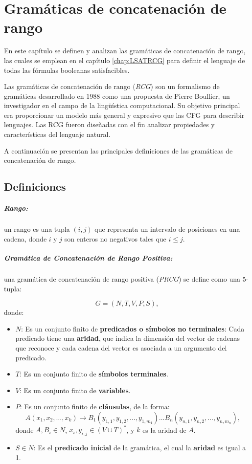 
\chapter{Gramáticas de concatenación de rango}
\label{chap:RCG}

En este capítulo se definen y analizan las gramáticas de concatenación de rango, las cuales se emplean en el
capítulo \ref{chap:LSATRCG} para definir el lenguaje de todas las fórmulas booleanas satisfacibles.

Las gramáticas de concatenación de rango (\textit{RCG}) \cite{mainRCGBib} son un formalismo de gramáticas desarrollado
en 1988 como una propuesta de Pierre Boullier, un investigador en el campo de la lingüística computacional. Su
objetivo principal era proporcionar un modelo más general y expresivo que las CFG para describir lenguajes.
Las RCG fueron diseñadas con el fin analizar propiedades y características del lenguaje natural.

A continuación se presentan las principales definiciones de las gramáticas de concatenación de rango.

\section{Definiciones}

\paragraph{Rango:} un rango es una tupla $(i, j)$ que representa un intervalo de posiciones en una cadena, donde $i$ y $j$ son enteros no negativos tales que $i \leq j$.

\paragraph{Gramática de Concatenación de Rango Positiva:} una gramática de concatenación de rango positiva (\textit{PRCG}) se define como una 5-tupla:

\[
    G = (N, T, V, P, S),
\]
donde:

\begin{itemize}
    \item $N$: Es un conjunto finito de \textbf{predicados o símbolos no terminales}: Cada predicado tiene una \textbf{aridad}, que indica la dimensión del vector de cadenas que reconoce y cada cadena del vector es asociada a un argumento del predicado.
    \item $T$: Es un conjunto finito de \textbf{símbolos terminales}.
    \item $V$: Es un conjunto finito de \textbf{variables}.
    \item $P$: Es un conjunto finito de \textbf{cláusulas}, de la forma:
          \[
              A(x_1, x_2, \ldots, x_k) \to B_1(y_{1,1}, y_{1,2}, \ldots, y_{1,m_1}) \ldots B_n(y_{n,1}, y_{n,2}, \ldots, y_{n,m_n}),
          \]
          donde $A, B_i \in N$, $x_i, y_{i,j} \in (V \cup T)^*$, y $k$ es la aridad de $A$.
    \item $S \in N$: Es el \textbf{predicado inicial} de la gramática, el cual la \textbf{aridad} es igual a 1.
\end{itemize}

